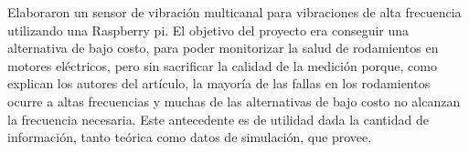 \textcite{Soto-Ocampo} Elaboraron un sensor de vibración multicanal para
vibraciones de alta frecuencia utilizando una Raspberry pi. El objetivo del
proyecto era conseguir una alternativa de bajo costo, para poder monitorizar
la salud de rodamientos en motores eléctricos, pero sin sacrificar la calidad de
la medición porque, como explican los autores del artículo, la mayoría de las
fallas en los rodamientos ocurre a altas frecuencias y muchas de las
alternativas de bajo costo no alcanzan la frecuencia necesaria. Este antecedente
es de utilidad dada la cantidad de información, tanto teórica como datos de
simulación, que provee.


